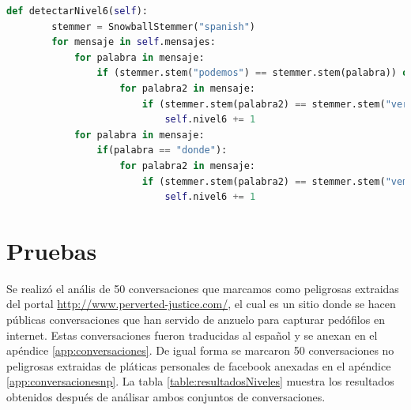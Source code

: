 \begin{lstlisting}[language=Python]
def detectarNivel6(self):
		stemmer = SnowballStemmer("spanish")
		for mensaje in self.mensajes:
			for palabra in mensaje:
				if (stemmer.stem("podemos") == stemmer.stem(palabra)) or (stemmer.stem(palabra) ==stemmer.stem("quiero")) or (stemmer.stem(palabra) == stemmer.stem("tenemos")):
					for palabra2 in mensaje:
						if (stemmer.stem(palabra2) == stemmer.stem("vernos")) or (stemmer.stem(palabra2) == stemmer.stem("verte")) or (stemmer.stem(palabra2) == stemmer.stem("reunirnos")) or (palabra2 == "ver"):
							self.nivel6 += 1
			for palabra in mensaje:
				if(palabra == "donde"):
					for palabra2 in mensaje:
						if (stemmer.stem(palabra2) == stemmer.stem("vemos")) or (stemmer.stem(palabra2) == stemmer.stem("verte")) or (stemmer.stem(palabra2) == stemmer.stem("reunirnos")) or (palabra2 == "ver"):
							self.nivel6 += 1
\end{lstlisting}
							
	
\section{Pruebas}

Se realiz\'o el an\'alis de 50 conversaciones que marcamos como peligrosas extraidas del portal \url{http://www.perverted-justice.com/}, el cual es un sitio donde se hacen p\'ublicas conversaciones que han servido de anzuelo para capturar ped\'ofilos en internet. Estas conversaciones fueron traducidas al espa\~nol y se anexan en el ap\'endice \ref{app:conversaciones}. De igual forma se marcaron 50 conversaciones no peligrosas extraidas de pl\'aticas personales de facebook anexadas en el ap\'endice \ref{app:conversacionesnp}. La tabla \ref{table:resultadosNiveles} muestra los resultados obtenidos despu\'es de an\'alisar ambos conjuntos de conversaciones.



